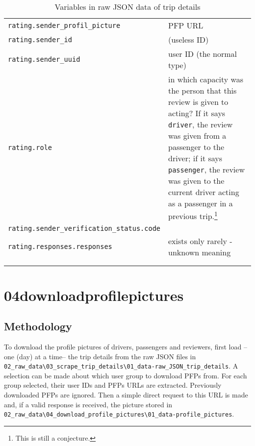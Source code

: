 \documentclass[11pt,a4paper]{article}
\begin{document}
\begin{longtable}{p{}p{}}
	\verb|rating.sender_profil_picture|				& PFP URL		\\
	\verb|rating.sender_id|							& (useless ID)		\\
	\verb|rating.sender_uuid|						& user ID (the normal type)		\\
	\verb|rating.role|								& in which capacity was the person that this review is given to acting? If it says \verb|driver|, the review was given from a passenger to the driver; if it says \verb|passenger|, the review was given to the current driver acting as a passenger in a previous trip.\footnote{This is still a conjecture.}		\\
	\verb|rating.sender_verification_status.code|	& 		\\
	\verb|rating.responses.responses|				& exists only rarely - unknown meaning		\\\hline \\
\caption{Variables in raw JSON data of trip details}
\label{tab:tripDetails}
\end{longtable}















\clearpage %
\section{04\textunderscore download\textunderscore profile\textunderscore pictures}

\subsection{Methodology}
To download the profile pictures of drivers, passengers and reviewers, first load --one (day) at a time-- the trip details from the raw JSON files in \\\verb|02_raw_data\03_scrape_trip_details\01_data-raw_JSON_trip_details|.
A selection can be made about which user group to download PFPs from.
For each group selected, their user IDs and PFPs URLs are extracted. 
Previously downloaded PFPs are ignored.
Then a simple direct request to this URL is made and, if a valid response is received, the picture stored in \\\verb|02_raw_data\04_download_profile_pictures\01_data-profile_pictures|. 
\end{document}
